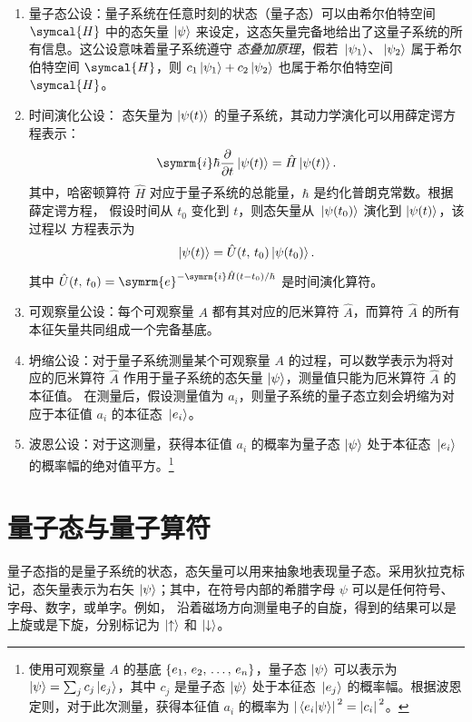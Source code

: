 \documentclass{fduthesis}
\newcommand{\hilbertH}{\symcal{H}}
\newcommand{\ee}{\symrm{e}}
\newcommand{\ii}{\symrm{i}}
\begin{document}
\begin{enumerate}
  \item 量子态公设：量子系统在任意时刻的状态（量子态）可以由希尔伯特空间 $\hilbertH$ 中的态矢量
    $\ket{\psi}$ 来设定，这态矢量完备地给出了这量子系统的所有信息。这公设意味着量子系统遵守%
    \emph{态叠加原理}，假若 $\ket*{\psi_1}$、$\ket*{\psi_2}$ 属于希尔伯特空间 $\hilbertH$，则
    $c_1\ket*{\psi_1} + c_2\ket*{\psi_2}$ 也属于希尔伯特空间 $\hilbertH$。
  \item 时间演化公设： 态矢量为 $\ket{\psi(t)}$ 的量子系统，其动力学演化可以用薛定谔方程表示：
    \begin{equation}
      \ii\hbar \pdv{t} \ket{\psi(t)} = \hat{H} \ket{\psi(t)}.
    \end{equation}
    其中，哈密顿算符 $\hat{H}$ 对应于量子系统的总能量，$\hbar$ 是约化普朗克常数。根据薛定谔方程，
    假设时间从 $t_0$ 变化到 $t$，则态矢量从 $\ket*{\psi(t_0)}$ 演化到 $\ket{\psi(t)}$，该过程以
    方程表示为
    \begin{equation}
      \ket{\psi(t)} = \hat{U}(t,\,t_0) \ket*{\psi(t_0)}.
    \end{equation}
    其中 $\hat{U}(t,\,t_0) = \ee^{-\ii\hat{H}(t-t_0) / \hbar}$ 是时间演化算符。
  \item 可观察量公设：每个可观察量 $A$ 都有其对应的厄米算符 $\hat{A}$，而算符 $\hat{A}$ 的所有
    本征矢量共同组成一个完备基底。
  \item 坍缩公设：对于量子系统测量某个可观察量 $A$ 的过程，可以数学表示为将对应的厄米算符
    $\hat{A}$ 作用于量子系统的态矢量 $\ket{\psi}$，测量值只能为厄米算符 $\hat{A}$ 的本征值。
    在测量后，假设测量值为 $a_i$，则量子系统的量子态立刻会坍缩为对应于本征值 $a_i$ 的本征态
    $\ket*{e_i}$。
  \item 波恩公设：对于这测量，获得本征值 $a_i$ 的概率为量子态 $\ket{\psi}$ 处于本征态 $\ket*{e_i}$
    的概率幅的绝对值平方。\footnote{%
      使用可观察量 $A$ 的基底 $\qty{e_1,\,e_2,\,\ldots,\,e_n}$，量子态 $\ket{\psi}$ 可以表示为
      $\ket{\psi} = \sum_j c_j \ket*{e_j}$，其中 $c_j$ 是量子态 $\ket{\psi}$ 处于本征态
      $\ket*{e_j}$ 的概率幅。根据波恩定则，对于此次测量，获得本征值 $a_i$ 的概率为
      $\abs*{\ip*{e_i}{\psi}}^2 = \abs*{c_i}^2$。}
\end{enumerate}

\section{量子态与量子算符}

量子态指的是量子系统的状态，态矢量可以用来抽象地表现量子态。采用狄拉克标记，态矢量表示为右矢
$\ket{\psi}$；其中，在符号内部的希腊字母 $\psi$ 可以是任何符号、字母、数字，或单字。例如，
沿着磁场方向测量电子的自旋，得到的结果可以是上旋或是下旋，分别标记为 $\ket{\uparrow}$ 和
$\ket{\downarrow}$。
\end{document}
